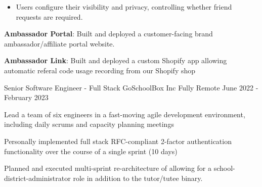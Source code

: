 \begin{cventries}
{\begin{cvitems}
{\begin{itemize}[leftmargin=0.5cm]
{              social media links.
            }
            \item{
              Users configure their visibility and privacy, controlling whether
              friend requests are required.
            }
          \end{itemize}
        }
        \item {
          \textbf{Ambassador Portal}: Built and deployed a customer-facing
          brand ambassador/affiliate portal website.
          \newline{}
        }
        \item{
          \textbf{Ambassador Link}: Built and deployed a custom Shopify app allowing automatic referal
          code usage recording from our Shopify shop
          \newline{}
        }
      \end{cvitems}
    }
  
  \cventry
    {Senior Software Engineer - Full Stack}
    {\hspace{0.7em}GoSchoolBox Inc}
    {Fully Remote}
    {June 2022 - February 2023}
    {
      \begin{cvitems}
        \item {
          Lead a team of six engineers in a fast-moving agile development environment, 
          including daily scrums and capacity planning meetings
        }
        \item {
          Personally implemented full stack RFC-compliant 2-factor
          authentication functionality over the course of a single sprint (10 days)
        }
        \item {
          Planned and executed multi-sprint re-architecture of allowing for a
          school-district-administrator role in addition to the tutor/tutee binary.
        }
      \end{cvitems}
    }



\end{cventries}
